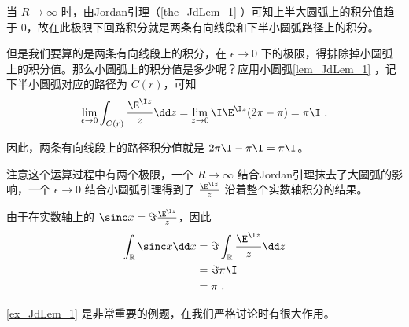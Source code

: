 \begin{example}{}
当 $R\to \infty$ 时，由Jordan引理（\autoref{the_JdLem_1} ）可知上半大圆弧上的积分值趋于 $0$，故在此极限下回路积分就是两条有向线段和下半小圆弧路径上的积分。

但是我们要算的是两条有向线段上的积分，在 $\epsilon\to 0$ 下的极限，得排除掉小圆弧上的积分值。那么小圆弧上的积分值是多少呢？应用小圆弧\autoref{lem_JdLem_1} ，记下半小圆弧对应的路径为 $C(r)$，可知
\begin{equation}
\lim_{\epsilon\to 0}\int_{C(r)}\frac{\E^{\I z}}{z}\dd z=\lim_{z\to 0}\I\E^{\I z}(2\pi-\pi)=\pi\I~.
\end{equation}

因此，两条有向线段上的路径积分值就是 $2\pi\I-\pi\I=\pi\I$。

注意这个运算过程中有两个极限，一个 $R\to\infty$ 结合Jordan引理抹去了大圆弧的影响，一个 $\epsilon\to 0$ 结合小圆弧引理得到了 $\frac{\E^{\I z}}{z}$ 沿着整个实数轴积分的结果。

由于在实数轴上的 $\sinc x=\Im \frac{\E^{\I z}}{z}$，因此
\begin{equation}
\begin{aligned}
\int_{\mathbb{R}}\sinc x \dd x&=\Im \int_{\mathbb{R}}\frac{\E^{\I z}}{z}\dd z\\
&=\Im \pi\I\\
&=\pi~.
\end{aligned}
\end{equation}



\end{example}

\autoref{ex_JdLem_1} 是非常重要的例题，在我们严格讨论时有很大作用。

